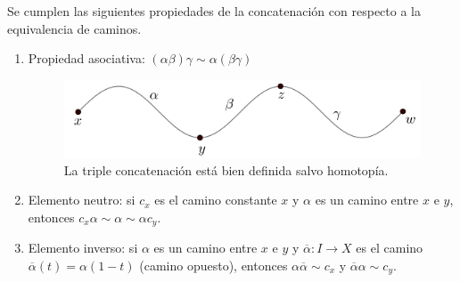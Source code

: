 \documentclass[bibtex, anon]{TEMat-article}
\begin{document}
\begin{proposicion} Se cumplen las siguientes propiedades de la concatenación con respecto a la equivalencia de caminos.
	\begin{enumerate}
		\item Propiedad asociativa: $(\alpha\beta)\gamma\sim\alpha(\beta\gamma)$ 
		\begin{figure}[h!]
			\centering
			\includegraphics[scale=0.2]{Imagenes/propi1}
			\caption{La triple concatenación está bien definida salvo homotopía.}
		\end{figure}
		
		\item Elemento neutro: si $c_x$ es el camino constante $x$ y $\alpha$ es un camino entre $x$ e $y$, entonces  $c_x\alpha\sim\alpha\sim\alpha c_y$.
		\item Elemento inverso: si $\alpha$ es un camino entre $x$ e $y$ y $\overline{\alpha}:I\to X$ es el camino $\overline{\alpha}(t)=\alpha(1-t)$ (camino opuesto), entonces $\alpha\overline{\alpha}\sim c_x$ y $\overline{\alpha}\alpha\sim c_y$.
	\end{enumerate}
\end{proposicion}
\end{document}
